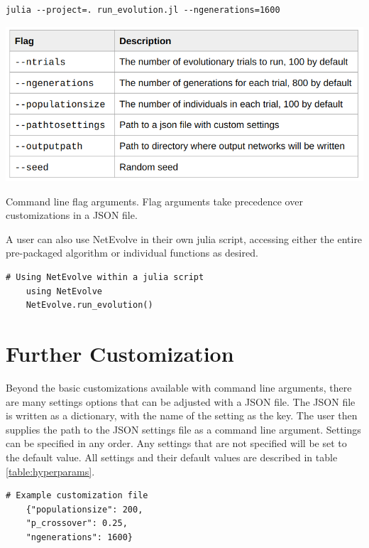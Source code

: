 \documentclass[12pt]{report}
\begin{document}
\begin{appendices}
\begin{Verbatim}[frame=single]
	julia --project=. run_evolution.jl --ngenerations=1600
\end{Verbatim}

\begin{table}
    \centering
    \includegraphics[width=15cm]{images/flag_args_table.png}
    \caption[Description of command line flag arguments]{Command line flag arguments. Flag arguments take precedence over customizations in a JSON file.}
    \label{table:flag_args}
\end{table}

A user can also use NetEvolve in their own julia script, accessing either the entire pre-packaged algorithm or individual functions as desired. 

\begin{Verbatim}[frame=single]
	# Using NetEvolve within a julia script
	using NetEvolve
	NetEvolve.run_evolution()
\end{Verbatim}

\section{Further Customization}
Beyond the basic customizations available with command line arguments, there are many settings options that can be adjusted with a JSON file. The JSON file is written as a dictionary, with the name of the setting as the key. The user then supplies the path to the JSON settings file as a command line argument. Settings can be specified in any order. Any settings that are not specified will be set to the default value. All settings and their default values are described in table \ref{table:hyperparams}.

\begin{Verbatim}[frame=single]
	# Example customization file
	{"populationsize": 200,
	"p_crossover": 0.25,
	"ngenerations": 1600}
\end{Verbatim}


\end{appendices}
\end{document}
